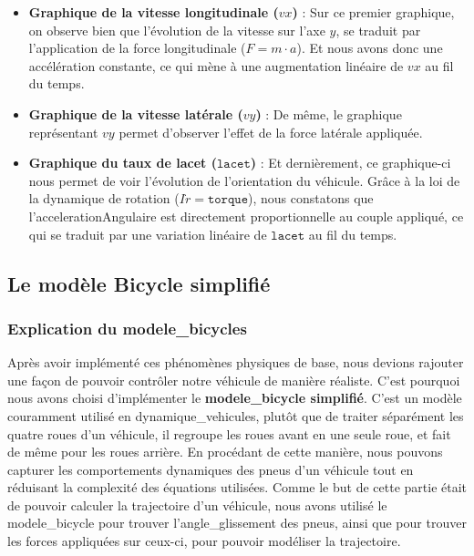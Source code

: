 \begin{itemize}
    \item \textbf{Graphique de la vitesse longitudinale ($vx$)} : Sur ce premier graphique, on observe bien que l'évolution de la vitesse sur l'axe $y$, se traduit par l'application de la force longitudinale ($ F = m \cdot a $).
    Et nous avons donc une accélération constante, ce qui mène à une augmentation linéaire de $vx$ au fil du temps.

    \item \textbf{Graphique de la vitesse latérale ($vy$)} : De même, le graphique représentant $vy$ permet d'observer l'effet de la force latérale appliquée.

    \item \textbf{Graphique du taux de lacet ({$\texttt{lacet}$})} : Et dernièrement, ce graphique-ci nous permet de voir l'évolution de l'orientation du véhicule.
    Grâce à la loi de la dynamique de rotation ($I\dot{r} = \texttt{torque}$), nous constatons que l'\gls{accelerationAngulaire} est directement proportionnelle au couple appliqué, ce qui se traduit par une variation linéaire de $\texttt{lacet}$ au fil du temps.
\end{itemize}

\subsection{Le modèle Bicycle simplifié}\label{subsec:le-modele-bicycle-simplifie}

\subsubsection{Explication du \glspl{modele_bicycle}}
Après avoir implémenté ces phénomènes physiques de base, nous devions rajouter une façon de pouvoir contrôler notre véhicule de manière réaliste.
C'est pourquoi nous avons choisi d'implémenter le \textbf{\gls{modele_bicycle} simplifié}.
C'est un modèle couramment utilisé en \glspl{dynamique_vehicule}, plutôt que de traiter séparément les quatre roues d'un véhicule, il regroupe les roues avant en une seule roue, et fait de même pour les roues arrière.
En procédant de cette manière, nous pouvons capturer les comportements dynamiques des pneus d'un véhicule tout en réduisant la complexité des équations utilisées.
Comme le but de cette partie était de pouvoir calculer la trajectoire d'un véhicule, nous avons utilisé le \gls{modele_bicycle} pour trouver l'\gls{angle_glissement} des pneus, ainsi que pour trouver les forces appliquées sur ceux-ci, pour pouvoir modéliser la trajectoire.

